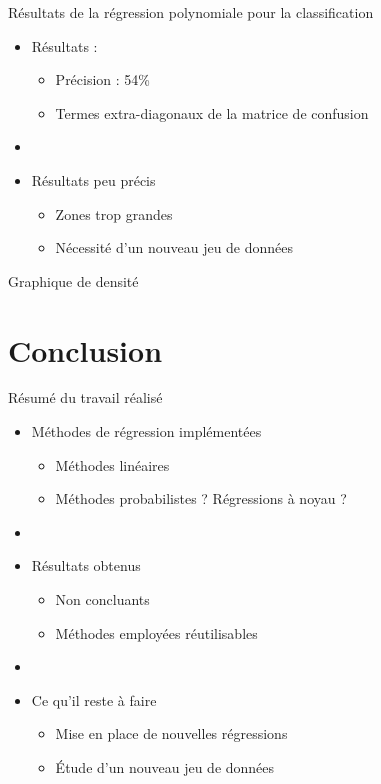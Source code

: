 \documentclass{beamer}
\begin{document}
\begin{frame}{Résultats de la régression polynomiale pour la classification}
  \begin{itemize}
    \item Résultats :
    \begin{itemize}
      \item Précision : 54\%
      \item Termes extra-diagonaux de la matrice de confusion
    \end{itemize}
    \item[]
    \item Résultats peu précis
    \begin{itemize}
      \item Zones trop grandes
      \item Nécessité d'un nouveau jeu de données
    \end{itemize}
  \end{itemize}
\end{frame}

\begin{frame}{Graphique de densité}
  \begin{center}
  \end{center}
\end{frame}

\section*{Conclusion}

\begin{frame}{Résumé du travail réalisé}
  \begin{itemize}
    \item Méthodes de régression implémentées
    \begin{itemize}
      \item Méthodes linéaires
      \item Méthodes probabilistes ? Régressions à noyau ?
    \end{itemize}
    \item[]
    \item Résultats obtenus
    \begin{itemize}
      \item Non concluants
      \item Méthodes employées réutilisables
    \end{itemize}
    \item[]
    \item Ce qu'il reste à faire
    \begin{itemize}
      \item Mise en place de nouvelles régressions
      \item \'Etude d'un nouveau jeu de données
    \end{itemize}
  \end{itemize}
\end{frame}
\end{document}
